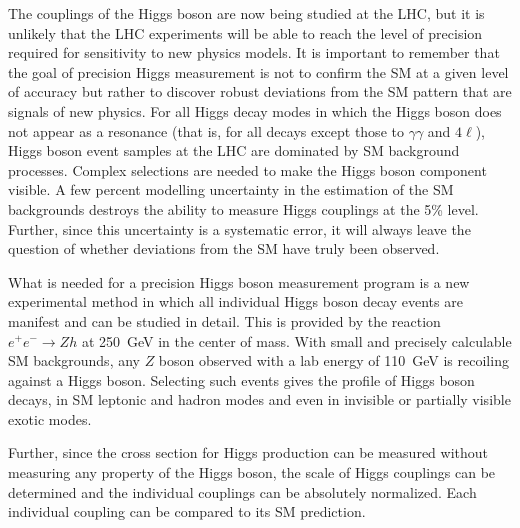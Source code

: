 \documentclass[%
 reprint,
 amsmath,amssymb,
 aps,
]{revtex4-1}
\def\ee{e^+e^-}
\begin{document}
The couplings of the Higgs boson are now being studied at the LHC, but
it is unlikely that the LHC experiments will be able to reach the
level of precision required for sensitivity to new physics models. 
It is important to remember that the goal of
precision Higgs measurement is not to confirm the SM at a given level
of accuracy but rather to discover robust deviations from the SM
pattern that are signals of new physics.   For all Higgs decay modes in which the
Higgs boson does not appear as a resonance (that is, for all decays
except those to 
$\gamma\gamma$ and $4\ell$), Higgs boson event samples at the LHC are dominated
by SM background processes.  Complex selections are needed to make the
Higgs boson component visible. A few percent modelling uncertainty in
the estimation of the SM backgrounds
 destroys the ability to measure Higgs couplings at the 5\%
level.  Further, since this uncertainty is a systematic error, it will
always leave the question of whether deviations from the SM have truly
been observed.

What is needed for a precision Higgs boson measurement program
is a new experimental method in which all individual Higgs boson decay events
are manifest and can be studied in detail.   This is provided by the reaction
$\ee\to Zh$ at 250~GeV in the center of mass. With small and precisely 
calculable SM backgrounds, any $Z$ boson observed with a lab energy 
of 110~GeV is recoiling against a Higgs boson.   Selecting such events 
gives the profile of Higgs boson decays, in SM leptonic and hadron modes 
and even in invisible or partially visible exotic modes. 

Further, since the cross section for Higgs production can be measured
without measuring any property of the Higgs boson, the scale of Higgs
couplings can be determined and the individual couplings can be
absolutely normalized.  Each individual coupling can be compared to
its SM prediction.
\end{document}
